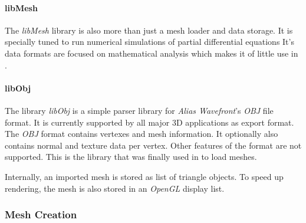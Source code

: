 \paragraph{libMesh}
The \textit{libMesh} library is also more than just a mesh loader and data storage.
It is specially tuned to run numerical simulations of partial differential equations
It's data formats are focused on mathematical analysis which makes it of little use in \ER.

\paragraph{libObj}
The library \textit{libObj}\cite{libobj} is a simple parser library for \textit{Alias Wavefront}'s \textit{OBJ} file format.
It is currently supported by all major 3D applications as export format.
The \textit{OBJ} format contains vertexes and mesh information.
It optionally also contains normal and texture data per vertex.
Other features of the format are not supported.
This is the library that was finally used in \ER to load meshes.

Internally, an imported mesh is stored as list of triangle objects.
To speed up rendering, the mesh is also stored in an \textit{OpenGL} display list.

\subsubsection{Mesh Creation}
\paragraph{}


